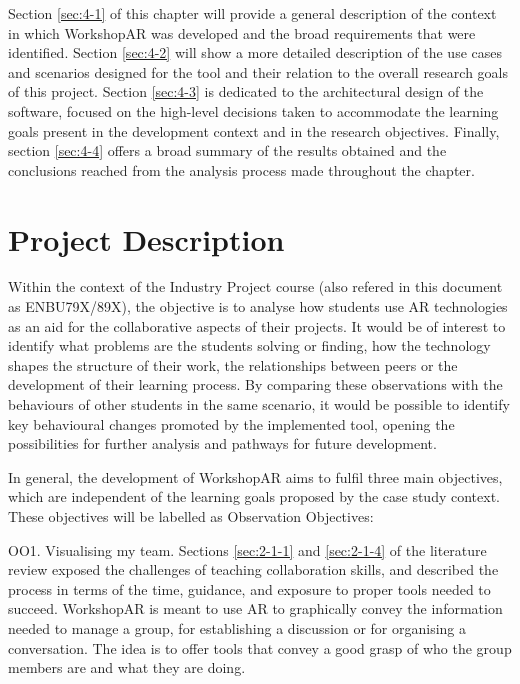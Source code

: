 Section \ref{sec:4-1} of this chapter will provide a general description of the context in which WorkshopAR was developed and the broad requirements that were identified.
Section \ref{sec:4-2} will show a more detailed description of the use cases and scenarios designed for the tool and their relation to the overall research goals of this
project. Section \ref{sec:4-3} is dedicated to the architectural design of the software, focused on the high-level decisions taken to accommodate the learning goals
present in the development context and in the research objectives. Finally, section \ref{sec:4-4} offers a broad summary of the results obtained and the conclusions
reached from the analysis process made throughout the chapter.

\section{Project Description \label{sec:4-1}}

Within the context of the Industry Project course (also refered in this document as ENBU79X/89X), the objective is to analyse how students use \ac{AR} technologies as an aid for the collaborative aspects of their
projects. It would be of interest to identify what problems are the students solving or finding, how the technology shapes the structure of their work, the relationships
between peers or the development of their learning process. By comparing these observations with the behaviours of other students in the same scenario, it would be
possible to identify key behavioural changes promoted by the implemented tool, opening the possibilities for further analysis and pathways for future development.

In general, the development of WorkshopAR aims to fulfil three main objectives, which are independent of the learning goals proposed by the case study context. These
objectives will be labelled as Observation Objectives:

\begin{displayquote}
    OO1. Visualising my team. Sections \ref{sec:2-1-1} and \ref{sec:2-1-4} of the literature review exposed the challenges of teaching collaboration skills, and described the
    process in terms of the time, guidance, and exposure to proper tools needed to succeed. WorkshopAR is meant to use \ac{AR} to graphically convey the information needed
    to manage a group, for establishing a discussion or for organising a conversation. The idea is to offer tools that convey a good grasp of who the group members are and
    what they are doing.
\end{displayquote}

